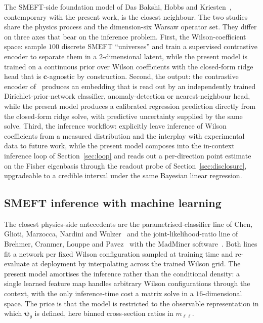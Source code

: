 \documentclass[11pt,a4paper]{article}
\newcommand{\mll}{m_{\ell\ell}}
\newcommand{\psib}{\bm{\psi}}
\begin{document}
The SMEFT-side foundation model of Das Bakshi, Hobbs and Kriesten~\cite{DasBakshi:2025reusable}, contemporary with the present work, is the closest neighbour. The two studies share the physics process and the dimension-six Warsaw operator set. They differ on three axes that bear on the inference problem. First, the Wilson-coefficient space: \cite{DasBakshi:2025reusable} sample $100$ discrete SMEFT ``universes'' and train a supervised contrastive encoder to separate them in a $2$-dimensional latent, while the present model is trained on a continuous prior over Wilson coefficients with the closed-form ridge head that is $\bm{c}$-agnostic by construction. Second, the output: the contrastive encoder of~\cite{DasBakshi:2025reusable} produces an embedding that is read out by an independently trained Dirichlet-prior-network classifier, anomaly-detection or nearest-neighbour head, while the present model produces a calibrated regression prediction directly from the closed-form ridge solve, with predictive uncertainty supplied by the same solve. Third, the inference workflow: \cite{DasBakshi:2025reusable} explicitly leave inference of Wilson coefficients from a measured distribution and the interplay with experimental data to future work, while the present model composes into the in-context inference loop of Section~\ref{sec:loop} and reads out a per-direction point estimate on the Fisher eigenbasis through the readout probe of Section~\ref{sec:disclosure}, upgradeable to a credible interval under the same Bayesian linear regression.

\subsection{SMEFT inference with machine learning}

The closest physics-side antecedents are the parametrised-classifier line of Chen, Glioti, Marzocca, Nardini and Wulzer~\cite{Chen:2022lcp} and the joint-likelihood-ratio line of Brehmer, Cranmer, Louppe and Pavez~\cite{Brehmer:2018kdj} with the MadMiner software~\cite{Brehmer:2019xox}. Both lines fit a network per fixed Wilson configuration sampled at training time and re-evaluate at deployment by interpolating across the trained Wilson grid. The present model amortises the inference rather than the conditional density: a single learned feature map handles arbitrary Wilson configurations through the context, with the only inference-time cost a matrix solve in a $16$-dimensional space. The price is that the model is restricted to the observable representation in which $\psib_\theta$ is defined, here binned cross-section ratios in $\mll$.
\end{document}

